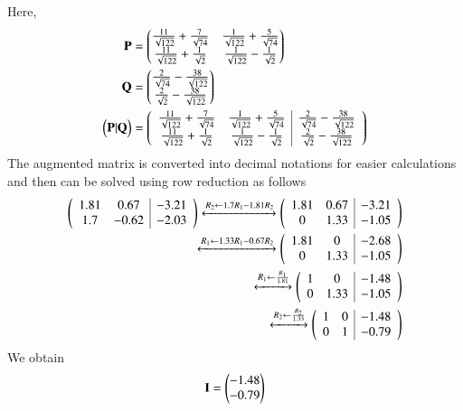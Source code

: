\documentclass[journal,12pt,twocolumn]{IEEEtran}
\begin{document}
\begin{flushleft}
Here,
\begin{align}
\mathbf{P}&=\begin{pmatrix}
\frac{11}{\sqrt{122}}+\frac{7}{\sqrt{74}} & \frac{1}{\sqrt{122}}+\frac{5}{\sqrt{74}}\\
\frac{11}{\sqrt{122}}+\frac{1}{\sqrt{2}} & \frac{1}{\sqrt{122}}-\frac{1}{\sqrt{2}}\\
\end{pmatrix}\\
\mathbf{Q}&=\begin{pmatrix}
\frac{2}{\sqrt{74}}-\frac{38}{\sqrt{122}}\\
\frac{2}{\sqrt{2}}-\frac{38}{\sqrt{122}}\\
\end{pmatrix}\\
\begin{pmatrix}\mathbf{P}|\mathbf{Q}\end{pmatrix} 
 &= \begin{pmatrix}
\begin{array}{cc|c}
\frac{11}{\sqrt{122}}+\frac{7}{\sqrt{74}} & \frac{1}{\sqrt{122}}+\frac{5}{\sqrt{74}} & \frac{2}{\sqrt{74}}-\frac{38}{\sqrt{122}} \\
\frac{11}{\sqrt{122}}+\frac{1}{\sqrt{2}} & \frac{1}{\sqrt{122}}-\frac{1}{\sqrt{2}} & \frac{2}{\sqrt{2}}-\frac{38}{\sqrt{122}} \\
\end{array}
\end{pmatrix}
\end{align}
The augmented matrix is converted into decimal notations for easier calculations and then can be solved using row reduction as follows \\
\begin{align}
\begin{pmatrix}
\begin{array}{cc|c}
1.81 & 0.67 & -3.21 \\
 1.7 & -0.62 & -2.03\\
\end{array}
\end{pmatrix}
 \xleftrightarrow[]{R_2\leftarrow 1.7R_1-1.81R_2}
\begin{pmatrix}
\begin{array}{cc|c}
1.81 & 0.67 & -3.21 \\
0 & 1.33 & -1.05\\
\end{array}
\end{pmatrix}\\
\xleftrightarrow[]{R_1\leftarrow 1.33R_1-0.67R_2}
\begin{pmatrix}
\begin{array}{cc|c}
1.81 & 0 & -2.68 \\
0 & 1.33 & -1.05\\
\end{array}
\end{pmatrix}\\
\xleftrightarrow[]{R_1\leftarrow \frac{R_1}{1.81}}
\begin{pmatrix}
\begin{array}{cc|c}
1 & 0 & -1.48 \\
0 & 1.33 & -1.05\\
\end{array}
\end{pmatrix}\\
\xleftrightarrow[]{R_2\leftarrow \frac{R_2}{1.33}}
\begin{pmatrix}
\begin{array}{cc|c}
1 & 0 & -1.48 \\
0 & 1 & -0.79\\
\end{array}
\end{pmatrix}
\end{align}
We obtain 
\begin{align}
\mathbf{I}=\begin{pmatrix}-1.48\\-0.79\end{pmatrix}
\end{align}


\end{flushleft}
\end{document}
